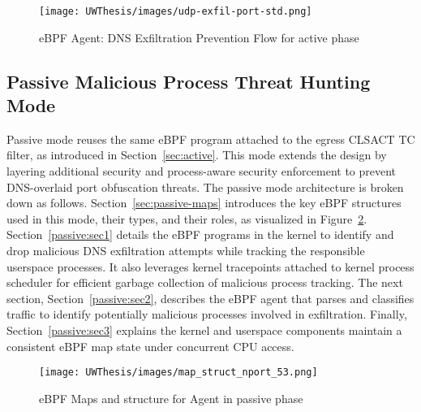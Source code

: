 \documentclass [11pt, proquest] {uwthesis}[2020/02/24]
\begin{document}
\label{sec:data_plane_standard_port}
\begin{figure}[htbp]
    \texttt{[image: UWThesis/images/udp-exfil-port-std.png]}
\caption{eBPF Agent: DNS Exfiltration Prevention Flow for active phase}
\label{sec:dp-active-phase}
\end{figure}

\subsection{Passive Malicious Process Threat Hunting Mode}
\label{sec:passive}
Passive mode reuses the same eBPF program attached to the egress CLSACT TC filter, as introduced in Section~\ref{sec:active}. This mode extends the design by layering additional security and process-aware security enforcement to prevent DNS-overlaid port obfuscation threats.
The passive mode architecture is broken down as follows. Section~\ref{sec:passive-maps} introduces the key eBPF structures used in this mode, their types, and their roles, as visualized in Figure~\ref{sec:dp_eBPF_LRU_Maps_passive}. Section~\ref{passive:sec1} details the eBPF programs in the kernel to identify and drop malicious DNS exfiltration attempts while tracking the responsible userspace processes. It also leverages kernel tracepoints attached to kernel process scheduler for efficient garbage collection of malicious process tracking. The next section, Section~\ref{passive:sec2}, describes the eBPF agent that parses and classifies traffic to identify potentially malicious processes involved in exfiltration. Finally, Section~\ref{passive:sec3} explains the kernel and userspace components maintain a consistent eBPF map state under concurrent CPU access.



\begin{figure}[H]
\centering
\texttt{[image: UWThesis/images/map\_struct\_nport\_53.png]}
\caption{eBPF Maps and structure for Agent in passive phase}
\label{sec:dp_eBPF_LRU_Maps_passive}
\end{figure}
\end{document}
